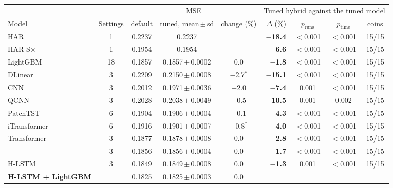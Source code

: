 \begin{tabular}{@{}lccccrccc@{}}
\toprule
 & & \multicolumn{3}{c}{MSE} & \multicolumn{4}{c}{Tuned hybrid against the tuned model} \\
\cmidrule(lr){3-5}\cmidrule(l){6-9}
Model & Settings & default & tuned, mean\,$\pm$\,sd & change (\%) & $\Delta$ (\%) & $p_{\mathrm{runs}}$ & $p_{\mathrm{time}}$ & coins \\
\midrule
HAR & 1 & 0.2237 & 0.2237 &  & \textbf{$-$18.4} & $<$0.001 & $<$0.001 & 15/15 \\
HAR-S$\times$ & 1 & 0.1954 & 0.1954 &  & \textbf{$-$6.6} & $<$0.001 & $<$0.001 & 15/15 \\
LightGBM & 18 & 0.1857 & 0.1857\,$\pm$\,0.0002 & 0.0 & \textbf{$-$1.8} & $<$0.001 & $<$0.001 & 15/15 \\
DLinear & 3 & 0.2209 & 0.2150\,$\pm$\,0.0008 & $-$2.7$^{*}$ & \textbf{$-$15.1} & $<$0.001 & $<$0.001 & 15/15 \\
CNN & 3 & 0.2012 & 0.1971\,$\pm$\,0.0036 & $-$2.0 & \textbf{$-$7.4} & 0.001 & $<$0.001 & 15/15 \\
QCNN & 3 & 0.2028 & 0.2038\,$\pm$\,0.0049 & +0.5 & \textbf{$-$10.5} & 0.001 & 0.002 & 15/15 \\
PatchTST & 6 & 0.1904 & 0.1906\,$\pm$\,0.0004 & +0.1 & \textbf{$-$4.3} & $<$0.001 & $<$0.001 & 15/15 \\
iTransformer & 6 & 0.1916 & 0.1901\,$\pm$\,0.0007 & $-$0.8$^{*}$ & \textbf{$-$4.0} & $<$0.001 & $<$0.001 & 15/15 \\
Transformer & 3 & 0.1877 & 0.1878\,$\pm$\,0.0008 & 0.0 & \textbf{$-$2.8} & $<$0.001 & $<$0.001 & 15/15 \\
\HQ{} & 3 & 0.1856 & 0.1856\,$\pm$\,0.0004 & 0.0 & \textbf{$-$1.7} & $<$0.001 & $<$0.001 & 15/15 \\
H-LSTM & 3 & 0.1849 & 0.1849\,$\pm$\,0.0008 & 0.0 & \textbf{$-$1.3} & 0.001 & $<$0.001 & 15/15 \\
\addlinespace[2pt]
\textbf{H-LSTM + LightGBM} &  & 0.1825 & 0.1825\,$\pm$\,0.0003 & 0.0 &  &  &  &  \\
\bottomrule
\end{tabular}
